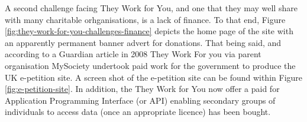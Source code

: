 A second challenge facing They Work for You, and one that they may well share with many charitable orhganisations, is a lack of finance.
To that end, Figure \ref{fig:they-work-for-you-challenges-finance} depicts the home page of the site with an apparently permanent banner advert for donations.
That being said, and according to a Guardian article in 2008 \cite{guardian-tom-steinberg} They Work For you via parent organisation MySociety undertook paid work for the government to produce the UK e-petition site.
A screen shot of the e-petition site can be found within Figure \ref{fig:e-petition-site}.
In addition, the They Work for You now offer a paid for Application Programming Interface (or API) enabling secondary groups of individuals to access data (once an appropriate licence) has been bought.